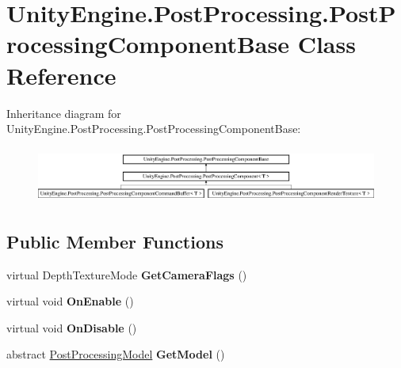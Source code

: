 \hypertarget{class_unity_engine_1_1_post_processing_1_1_post_processing_component_base}{}\section{Unity\+Engine.\+Post\+Processing.\+Post\+Processing\+Component\+Base Class Reference}
\label{class_unity_engine_1_1_post_processing_1_1_post_processing_component_base}
Inheritance diagram for Unity\+Engine.\+Post\+Processing.\+Post\+Processing\+Component\+Base\+:\begin{figure}[H]
\begin{center}
\leavevmode
\includegraphics[height=1.854305cm]{class_unity_engine_1_1_post_processing_1_1_post_processing_component_base}
\end{center}
\end{figure}
\subsection*{Public Member Functions}
\begin{DoxyCompactItemize}
\item 
\mbox{\label{class_unity_engine_1_1_post_processing_1_1_post_processing_component_base_ac381619e1d1a3781fb4183badc0e7b18}} 
virtual Depth\+Texture\+Mode {\bfseries Get\+Camera\+Flags} ()
\item 
\mbox{\label{class_unity_engine_1_1_post_processing_1_1_post_processing_component_base_aff2b95b21422cfffb5a0542d2cd23e08}} 
virtual void {\bfseries On\+Enable} ()
\item 
\mbox{\label{class_unity_engine_1_1_post_processing_1_1_post_processing_component_base_a66da5b84f9e06315b95183a12cc2f10c}} 
virtual void {\bfseries On\+Disable} ()
\item 
\mbox{\label{class_unity_engine_1_1_post_processing_1_1_post_processing_component_base_a83558500b9f9bf231f57bffee50062ea}} 
abstract \hyperlink{class_unity_engine_1_1_post_processing_1_1_post_processing_model}{Post\+Processing\+Model} {\bfseries Get\+Model} ()
\end{DoxyCompactItemize}
